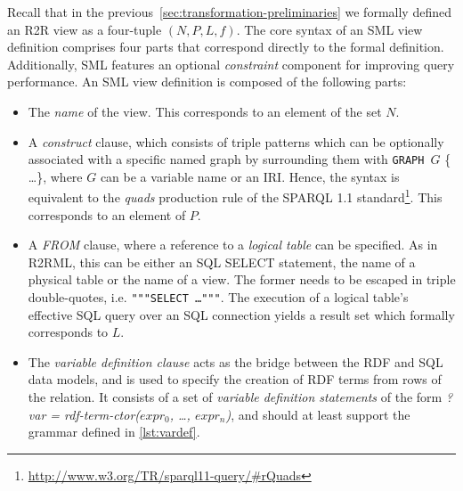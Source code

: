 Recall that in the previous~\autoref{sec:transformation-preliminaries} we
formally defined an R2R view as a four-tuple $(N, P, L, f)$.
The core syntax of an SML view definition comprises four parts that correspond
directly to the formal definition. Additionally, SML features
an optional \emph{constraint} component for improving query performance.
An SML view definition is composed of the following parts:
\begin{itemize}
  \item The \emph{name} of the view. This corresponds to an element of the
  set $N$.

  \item A \emph{construct} clause, which consists of triple patterns
  which can be optionally associated with a specific named graph by
  surrounding
  them with \texttt{GRAPH }$G${ \{ \ldots \}}, where $G$ can be a variable name
  or an IRI.
  Hence, the syntax is equivalent to the \emph{quads} production rule of the
  SPARQL 1.1 standard\footnote{\url{http://www.w3.org/TR/sparql11-query/\#rQuads}}.
  This corresponds to an element of $P$.

  \item A \emph{FROM} clause, where a reference to a \emph{logical table} can be specified.
  As in R2RML, this can be either an SQL SELECT statement, the name of a
  physical table or the name of a view.
  The former needs to be escaped in triple double-quotes, i.e. \texttt{"""SELECT \ldots"""}.
  The execution of a logical table's effective SQL query over an SQL connection
  yields a result set which formally corresponds to $L$.

  \item The \emph{variable definition clause} acts as the bridge between the RDF
  and SQL data models, and is used to specify the creation of RDF terms from
  rows of the relation.
  It consists of a set of \emph{variable definition statements} of the
  form \emph{?var = rdf-term-ctor($expr_0$, \ldots, $expr_n$)}, and should
  at least support the grammar defined in \ref{lst:vardef}.


\end{itemize}
